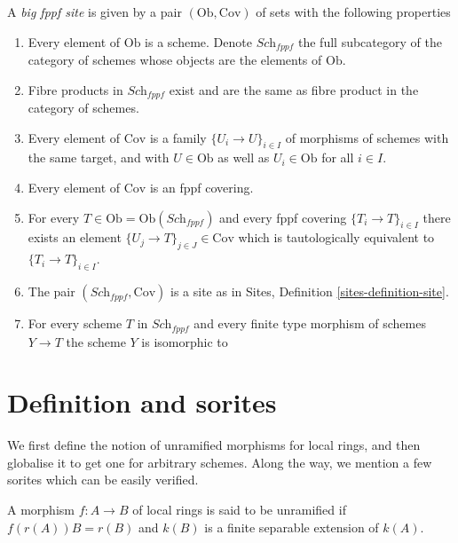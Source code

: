 \begin{definition}
\label{definition-big-fppf-site}
A {\it big fppf site} is given by a pair $(\text{Ob}, \text{Cov})$ of sets
with the following properties
\begin{enumerate}
\item Every element of $\text{Ob}$ is a scheme.
Denote $\textit{Sch}_{fppf}$ the full subcategory of the
category of schemes whose objects are the elements of
$\text{Ob}$.
\item Fibre products in $\textit{Sch}_{fppf}$ exist and are
the same as fibre product in the category of schemes.
\item Every element of $\text{Cov}$ is a family
$\{U_i \to U\}_{i\in I}$ of morphisms of schemes
with the same target, and with $U \in \text{Ob}$ as well as
$U_i \in \text{Ob}$ for all $i \in I$.
\item Every element of $\text{Cov}$ is an fppf covering.
\item For every $T \in \text{Ob} = \text{Ob}(\textit{Sch}_{fppf})$
and every fppf covering $\{T_i \to T\}_{i\in I}$ there exists
an element $\{U_j \to T\}_{j \in J} \in \text{Cov}$ which
is tautologically equivalent to $\{T_i \to T\}_{i\in I}$.
\item The pair $(\textit{Sch}_{fppf}, \text{Cov})$ is a site as in
Sites, Definition \ref{sites-definition-site}.
\item For every scheme $T$ in $\textit{Sch}_{fppf}$
and every finite type morphism of schemes $Y \to T$
the scheme $Y$ is isomorphic to 
\end{enumerate}
\end{definition}
















\section{Definition and sorites}
\label{section-unramified-definition}

\noindent
We first define the notion of unramified morphisms for local rings, and then
globalise it to get one for arbitrary schemes. Along the way, we mention a few
sorites which can be easily verified.

\begin{definition}
\label{definition-unramified-rings}
A morphism $f:A \to B$ of local rings is said to be unramified if
$f(r(A))B = r(B)$ and $k(B)$ is a finite separable extension of $k(A)$. 
\end{definition}

